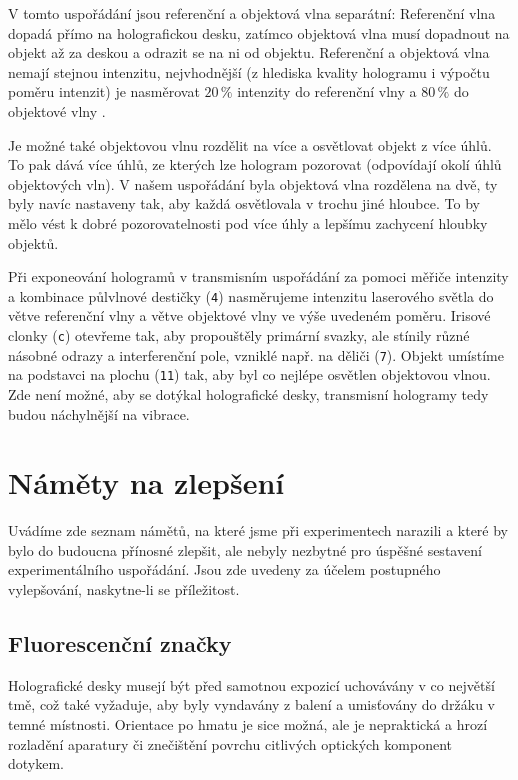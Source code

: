 \documentclass[twoside,project]{../MFFPrace}
\begin{document}
\medskip

V tomto uspořádání jsou referenční a objektová vlna separátní: Referenční vlna dopadá přímo na holografickou desku, zatímco objektová vlna musí dopadnout na objekt až za deskou a odrazit se na ni od objektu. Referenční a objektová vlna nemají stejnou intenzitu, nejvhodnější (z hlediska kvality hologramu i výpočtu poměru intenzit) je nasměrovat $20\,\%$ intenzity do referenční vlny a $80\,\%$ do objektové vlny \cite{projekt}.

Je možné také objektovou vlnu rozdělit na více a osvětlovat objekt z více úhlů. To pak dává více úhlů, ze kterých lze hologram pozorovat (odpovídají okolí úhlů objektových vln). V našem uspořádání byla objektová vlna rozdělena na dvě, ty byly navíc nastaveny tak, aby každá osvětlovala v trochu jiné hloubce. To by mělo vést k dobré pozorovatelnosti pod více úhly a lepšímu zachycení hloubky objektů.

\medskip

Při exponeování hologramů v transmisním uspořádání za pomoci měřiče intenzity a kombinace půlvlnové destičky (\texttt{4}) nasměrujeme intenzitu laserového světla do větve referenční vlny a větve objektové vlny ve výše uvedeném poměru. Irisové clonky (\texttt{c}) otevřeme tak, aby propouštěly primární svazky, ale stínily různé násobné odrazy a interferenční pole, vzniklé např. na děliči (\texttt{7}). Objekt umístíme na podstavci na plochu (\texttt{11}) tak, aby byl co nejlépe osvětlen objektovou vlnou. Zde není možné, aby se dotýkal holografické desky, transmisní hologramy tedy budou náchylnější na vibrace.

\section{Náměty na zlepšení}
Uvádíme zde seznam námětů, na které jsme při experimentech narazili a které by bylo do budoucna přínosné zlepšit, ale nebyly nezbytné pro úspěšné sestavení experimentálního uspořádání. Jsou zde uvedeny za účelem postupného vylepšování, naskytne-li se příležitost.

\subsection*{Fluorescenční značky}
Holografické desky musejí být před samotnou expozicí uchovávány v co největší tmě, což také vyžaduje, aby byly vyndavány z balení a umisťovány do držáku v temné místnosti. Orientace po hmatu je sice možná, ale je nepraktická a hrozí rozladění aparatury či znečištění povrchu citlivých optických komponent dotykem.
\end{document}
